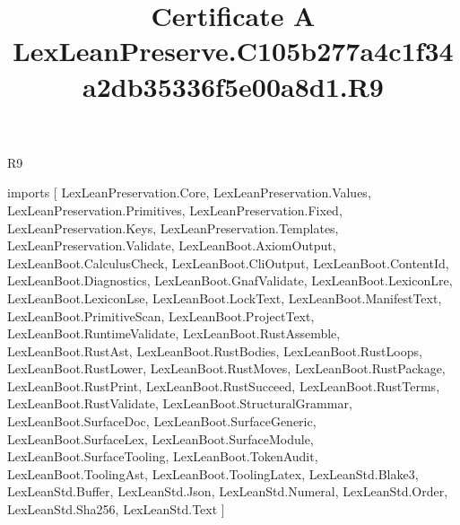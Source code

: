 \begin{lexlean}{R9}
\title{Certificate A LexLeanPreserve.C105b277a4c1f34a2db35336f5e00a8d1.R9}
\begin{coremodule}
imports [
  LexLeanPreservation.Core,
  LexLeanPreservation.Values,
  LexLeanPreservation.Primitives,
  LexLeanPreservation.Fixed,
  LexLeanPreservation.Keys,
  LexLeanPreservation.Templates,
  LexLeanPreservation.Validate,
  LexLeanBoot.AxiomOutput,
  LexLeanBoot.CalculusCheck,
  LexLeanBoot.CliOutput,
  LexLeanBoot.ContentId,
  LexLeanBoot.Diagnostics,
  LexLeanBoot.GnafValidate,
  LexLeanBoot.LexiconLre,
  LexLeanBoot.LexiconLse,
  LexLeanBoot.LockText,
  LexLeanBoot.ManifestText,
  LexLeanBoot.PrimitiveScan,
  LexLeanBoot.ProjectText,
  LexLeanBoot.RuntimeValidate,
  LexLeanBoot.RustAssemble,
  LexLeanBoot.RustAst,
  LexLeanBoot.RustBodies,
  LexLeanBoot.RustLoops,
  LexLeanBoot.RustLower,
  LexLeanBoot.RustMoves,
  LexLeanBoot.RustPackage,
  LexLeanBoot.RustPrint,
  LexLeanBoot.RustSucceed,
  LexLeanBoot.RustTerms,
  LexLeanBoot.RustValidate,
  LexLeanBoot.StructuralGrammar,
  LexLeanBoot.SurfaceDoc,
  LexLeanBoot.SurfaceGeneric,
  LexLeanBoot.SurfaceLex,
  LexLeanBoot.SurfaceModule,
  LexLeanBoot.SurfaceTooling,
  LexLeanBoot.TokenAudit,
  LexLeanBoot.ToolingAst,
  LexLeanBoot.ToolingLatex,
  LexLeanStd.Blake3,
  LexLeanStd.Buffer,
  LexLeanStd.Json,
  LexLeanStd.Numeral,
  LexLeanStd.Order,
  LexLeanStd.Sha256,
  LexLeanStd.Text
]


\end{coremodule}
\end{lexlean}
